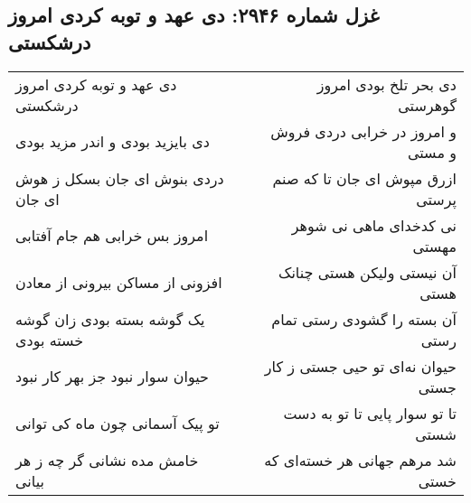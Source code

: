 \begin{center}
\section*{غزل شماره ۲۹۴۶: دی عهد و توبه کردی امروز درشکستی}
\label{sec:2946}
\begin{longtable}{l p{0.5cm} r}
دی عهد و توبه کردی امروز درشکستی
&&
دی بحر تلخ بودی امروز گوهرستی
\\
دی بایزید بودی و اندر مزید بودی
&&
و امروز در خرابی دردی فروش و مستی
\\
دردی بنوش ای جان بسکل ز هوش ای جان
&&
ازرق مپوش ای جان تا که صنم پرستی
\\
امروز بس خرابی هم جام آفتابی
&&
نی کدخدای ماهی نی شوهر مهستی
\\
افزونی از مساکن بیرونی از معادن
&&
آن نیستی ولیکن هستی چنانک هستی
\\
یک گوشه بسته بودی زان گوشه خسته بودی
&&
آن بسته را گشودی رستی تمام رستی
\\
حیوان سوار نبود جز بهر کار نبود
&&
حیوان نه‌ای تو حیی جستی ز کار جستی
\\
تو پیک آسمانی چون ماه کی توانی
&&
تا تو سوار پایی تا تو به دست شستی
\\
خامش مده نشانی گر چه ز هر بیانی
&&
شد مرهم جهانی هر خسته‌ای که خستی
\\
\end{longtable}
\end{center}
